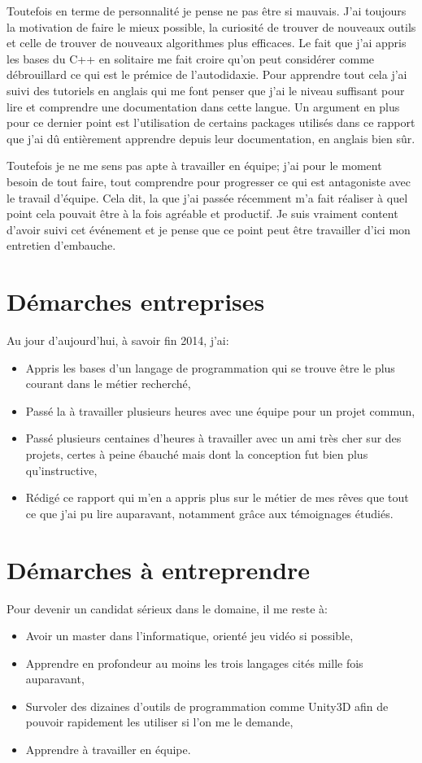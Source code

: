 \documentclass[12pt, a4paper]{report} %
\begin{document}
Toutefois en terme de personnalité je pense ne pas être si mauvais. J'ai toujours la motivation de faire le mieux possible, la curiosité de trouver de nouveaux outils et celle de trouver de nouveaux algorithmes plus efficaces. Le fait que j'ai appris les bases du C++ en solitaire me fait croire qu'on peut considérer comme débrouillard ce qui est le prémice de l'autodidaxie. Pour apprendre tout cela j'ai suivi des tutoriels en anglais qui me font penser que j'ai le niveau suffisant pour lire et comprendre une documentation dans cette langue. Un argument en plus pour ce dernier point est l'utilisation de certains packages utilisés dans ce rapport que j'ai dû entièrement apprendre depuis leur documentation, en anglais bien sûr.

Toutefois je ne me sens pas apte à travailler en équipe; j'ai pour le moment besoin de tout faire, tout comprendre pour progresser ce qui est antagoniste avec le travail d'équipe. Cela dit, la \lni{} que j'ai passée récemment m'a fait réaliser à quel point cela pouvait être à la fois agréable et productif. Je suis vraiment content d'avoir suivi cet événement et je pense que ce point peut être travailler d'ici mon entretien d'embauche.

\section{Démarches entreprises}
Au jour d'aujourd'hui, à savoir fin 2014, j'ai:
\begin{itemize}
\item
  Appris les bases d'un langage de programmation qui se trouve être le plus courant dans le métier recherché,
\item
  Passé la \lni{} à travailler plusieurs heures avec une équipe pour un projet commun,
\item
  Passé plusieurs centaines d'heures à travailler avec un ami très cher sur des projets, certes à peine ébauché mais dont la conception fut bien plus qu'instructive,
\item 
  Rédigé ce rapport qui m'en a appris plus sur le métier de mes rêves que tout ce que j'ai pu lire auparavant, notamment grâce aux témoignages étudiés.
\end{itemize}
\section{Démarches à entreprendre}
Pour devenir un candidat sérieux dans le domaine, il me reste à:
\begin{itemize}
\item
  Avoir un master dans l'informatique, orienté jeu vidéo si possible,
\item
  Apprendre en profondeur au moins les trois langages cités mille fois auparavant,
\item
  Survoler des dizaines d'outils de programmation comme Unity3D afin de pouvoir rapidement les utiliser si l'on me le demande,
\item
  Apprendre à travailler en équipe.
\end{itemize}
\end{document}

